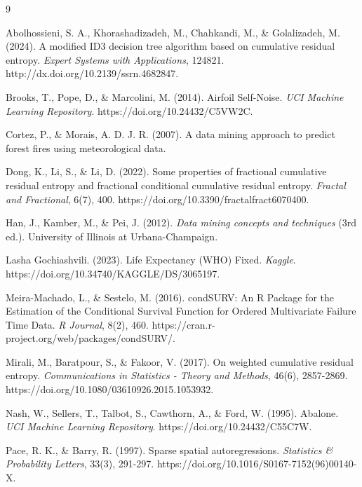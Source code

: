 \documentclass[twoside]{article}
\begin{document}
\begin{thebibliography}{9}

Abolhossieni, S. A., Khorashadizadeh, M., Chahkandi, M., \& Golalizadeh, M. (2024).
A modified ID3 decision tree algorithm based on cumulative residual entropy.
\emph{Expert Systems with Applications}, 124821.
http://dx.doi.org/10.2139/ssrn.4682847.

Brooks, T., Pope, D., \& Marcolini, M. (2014).
Airfoil Self-Noise.
\emph{UCI Machine Learning Repository}.
https://doi.org/10.24432/C5VW2C.

Cortez, P., \& Morais, A. D. J. R. (2007).
A data mining approach to predict forest fires using meteorological data.

Dong, K., Li, S., \& Li, D. (2022).
Some properties of fractional cumulative residual entropy and fractional conditional cumulative residual entropy.
\emph{Fractal and Fractional}, 6(7), 400.
https://doi.org/10.3390/fractalfract6070400.

Han, J., Kamber, M., \& Pei, J. (2012).
\emph{Data mining concepts and techniques} (3rd ed.).
University of Illinois at Urbana-Champaign.

Lasha Gochiashvili. (2023).
Life Expectancy (WHO) Fixed.
\emph{Kaggle}.
https://doi.org/10.34740/KAGGLE/DS/3065197.

Meira-Machado, L., \& Sestelo, M. (2016).
condSURV: An R Package for the Estimation of the Conditional Survival Function for Ordered Multivariate Failure Time Data.
\emph{R Journal}, 8(2), 460.
https://cran.r-project.org/web/packages/condSURV/.

Mirali, M., Baratpour, S., \& Fakoor, V. (2017).
On weighted cumulative residual entropy.
\emph{Communications in Statistics - Theory and Methods}, 46(6), 2857-2869.
https://doi.org/10.1080/03610926.2015.1053932.

Nash, W., Sellers, T., Talbot, S., Cawthorn, A., \& Ford, W. (1995).
Abalone.
\emph{UCI Machine Learning Repository}.
https://doi.org/10.24432/C55C7W.

Pace, R. K., \& Barry, R. (1997).
Sparse spatial autoregressions.
\emph{Statistics \& Probability Letters}, 33(3), 291-297.
https://doi.org/10.1016/S0167-7152(96)00140-X.


\end{thebibliography}
\end{document}
